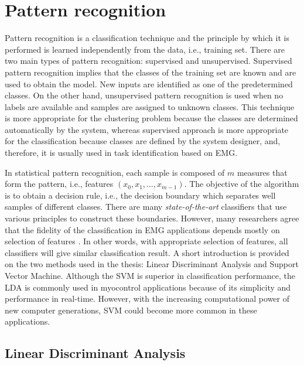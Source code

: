 \newpage
{}

\chapter[Pattern recognition]{Pattern recognition}\label{pattern_recognition}
Pattern recognition is a classification technique and the principle by which it is performed is learned independently from the data, i.e., training set. There are two main types of pattern recognition: supervised and unsupervised. Supervised pattern recognition implies that the classes of the training set are known and are used to obtain the model. New inputs are identified as one of the predetermined classes. On the other hand, unsupervised pattern recognition is used when no labels are available and samples are assigned to unknown classes. This technique is more appropriate for the clustering problem because the classes are determined automatically by the system, whereas supervised approach is more appropriate for the classification because classes are defined by the system designer, and, therefore, it is usually used in task identification based on EMG.

In statistical pattern recognition, each sample is composed of $m$ measures that form the pattern, i.e., features $(x_0, x_1, \dots, x_{m-1})$. The objective of the algorithm is to obtain a decision rule, i.e., the decision boundary which separates well samples of different classes. There are many \emph{state-of-the-art} classifiers that use various principles to construct these boundaries. However, many researchers agree that the fidelity of the classification in EMG applications depends mostly on selection of features \citep{Hakonen2015}. In other words, with appropriate selection of features, all classifiers will give similar classification result. A short introduction is provided on the two methods used in the thesis: Linear Discriminant Analysis and Support Vector Machine. Although the SVM is superior in classification performance, the LDA is commonly used in myocontrol applications because of its simplicity and performance in real-time. However, with the increasing computational power of new computer generations, SVM could become more common in these applications. 


\section{Linear Discriminant Analysis}

